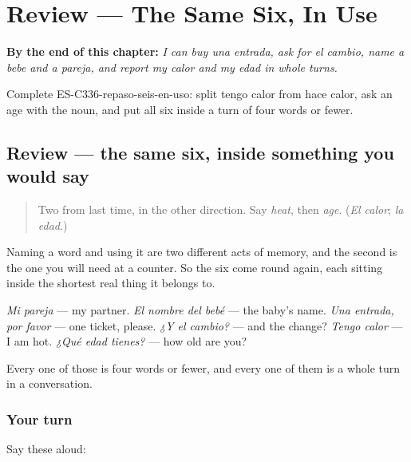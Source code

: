 
\chapter{Review --- The Same Six, In Use}
\label{ch:repaso-seis-en-uso}

\begin{chapteropening}
\textbf{By the end of this chapter:} \emph{I can buy una entrada, ask for el cambio, name a bebe and a pareja, and report my calor and my edad in whole turns.}

Complete ES-C336-repaso-seis-en-uso: split tengo calor from hace calor, ask an age with the noun, and put all six inside a turn of four words or fewer.
\end{chapteropening}

\section[(review)]{Review --- the same six, inside something you would say}

\label{lesson:ES-C336-repaso-seis-en-uso}



\begin{quote}
Two from last time, in the other direction. Say \emph{heat}, then \emph{age}. (\emph{El calor}; \emph{la edad}.)
\end{quote}

\begin{grammarlens}[title={What you've built}]
Naming a word and using it are two different acts of memory, and the second is the one you will need at a counter. So the six come round again, each sitting inside the shortest real thing it belongs to.

\emph{Mi pareja} --- my partner. \emph{El nombre del bebé} --- the baby's name. \emph{Una entrada, por favor} --- one ticket, please. \emph{¿Y el cambio?} --- and the change? \emph{Tengo calor} --- I am hot. \emph{¿Qué edad tienes?} --- how old are you?

Every one of those is four words or fewer, and every one of them is a whole turn in a conversation.
\end{grammarlens}

\subsection*{Your turn}
Say these aloud:

